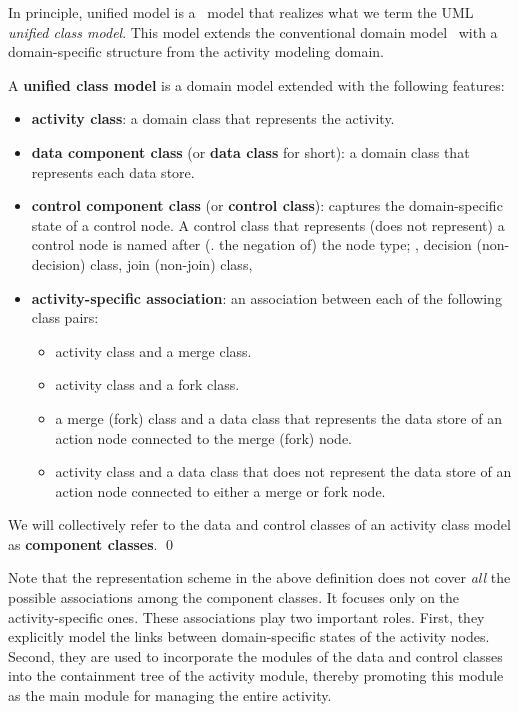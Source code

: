 In principle, unified model is a \dcsl~model that realizes what we term the UML \textit{unified class model}. This model extends the conventional domain model~\cite{evans_domain-driven_2004} with a domain-specific structure from the activity modeling domain.
%
\begin{definition} \label{def:unified-class-model}
	A \textbf{unified class model} is a domain model extended with the following features:
	
	\begin{itemize}%
		\item \textbf{activity class}: a domain class that represents the activity.
		\item \textbf{data component class} (or \textbf{data class} for short): a domain class that represents each data store.
		\item \textbf{control component class} (or \textbf{control class}): captures the domain-specific state of a control node. A control class that represents (\wrt does not represent) a control node is named after (\wrt. the negation of) the node type; \eg, decision (\wrt non-decision) class, join (\wrt non-join) class, \etc
		\item \textbf{activity-specific association}: an association between each of the following class pairs:
		\begin{itemize}
			\item activity class and a merge class.
			\item activity class and a fork class.
			\item a merge (\wrt fork) class and a data class that represents the data store of an action node connected to the merge (\wrt fork) node.
			\item activity class and a data class that does not represent the data store of an action node connected to either a merge or fork node.
		\end{itemize}        	
	\end{itemize}
	We will collectively refer to the data and control classes of an activity class model as \textbf{component classes}. \qed
\end{definition}

Note that the representation scheme in the above definition does not cover \textit{all} the possible associations among the component classes. It focuses only on the activity-specific ones. 
%
These associations play two important roles. First, they explicitly model the links between domain-specific states of the activity nodes. Second, they are used to incorporate the modules of the data and control classes into the containment tree of the activity module, thereby promoting this module as the main module for managing the entire activity.

